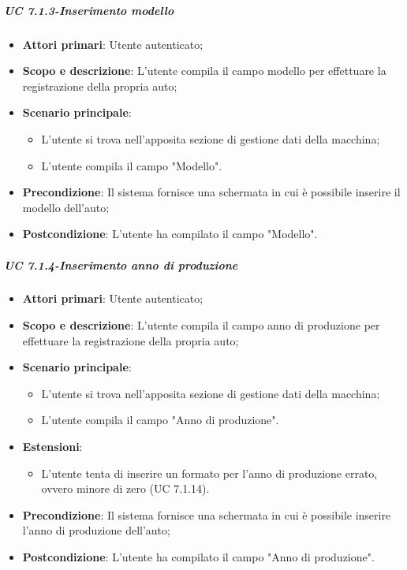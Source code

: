    \subparagraph{UC 7.1.3-Inserimento modello}
    \begin{itemize}
                \item \textbf{Attori primari}: Utente autenticato;
                
                 \item \textbf{Scopo e descrizione}: L'utente compila il campo modello per effettuare la registrazione della propria auto;
                 \item \textbf{Scenario principale}:
                 \begin{itemize}
                     \item L'utente si trova nell'apposita sezione di gestione dati della macchina;
                     \item L'utente compila il campo "Modello".
                 \end{itemize}
                 \item \textbf{Precondizione}: Il sistema fornisce una schermata in cui è possibile inserire il modello dell'auto;
                 \item \textbf{Postcondizione}: L'utente ha compilato il campo "Modello".
                 \end{itemize}
                 
   \subparagraph{UC 7.1.4-Inserimento anno di produzione}
   \begin{itemize}
                \item \textbf{Attori primari}: Utente autenticato;
                
                 \item \textbf{Scopo e descrizione}: L'utente compila il campo anno di produzione per effettuare la registrazione della propria auto;
                 \item \textbf{Scenario principale}: 
                 \begin{itemize}
                     \item L'utente si trova nell'apposita sezione di gestione dati della macchina;
                     \item L'utente compila il campo "Anno di produzione".
                 \end{itemize}
                 \item \textbf{Estensioni}:
                    \begin{itemize}
                        \item L'utente tenta di inserire un formato per l'anno di produzione errato, ovvero minore di zero (UC 7.1.14).
                    \end{itemize}
                 \item \textbf{Precondizione}: Il sistema fornisce una schermata in cui è possibile inserire l'anno di produzione dell'auto;
                 \item \textbf{Postcondizione}: L'utente ha compilato il campo "Anno di produzione".
                 \end{itemize}
                 
